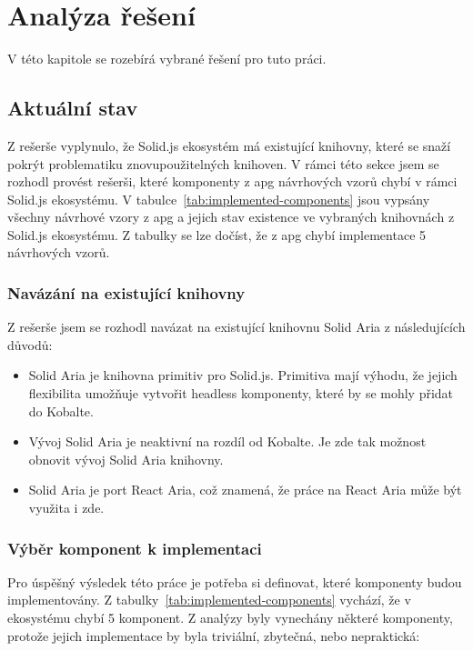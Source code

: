 \chapter{Analýza řešení}
\label{chap:analysis}

V této kapitole se rozebírá vybrané řešení pro tuto práci.

\section{Aktuální stav}

Z rešerše vyplynulo, že Solid.js ekosystém má existující knihovny, které se snaží pokrýt problematiku znovupoužitelných knihoven.
V rámci této sekce jsem se rozhodl provést rešerši, které komponenty z \gls{apg} návrhových vzorů chybí v rámci Solid.js ekosystému.
V tabulce~\ref{tab:implemented-components} jsou vypsány všechny návrhové vzory z \gls{apg} a jejich stav existence ve vybraných knihovnách z Solid.js ekosystému.
Z tabulky se lze dočíst, že z \gls{apg} chybí implementace 5 návrhových vzorů.

\subsection{Navázání na existující knihovny}

Z rešerše jsem se rozhodl navázat na existující knihovnu Solid Aria z následujících důvodů:

\begin{itemize}
      \item Solid Aria je knihovna primitiv pro Solid.js. Primitiva mají výhodu, že jejich flexibilita umožňuje vytvořit headless komponenty, které by se mohly přidat do Kobalte.
      \item Vývoj Solid Aria je neaktivní na rozdíl od Kobalte. Je zde tak možnost obnovit vývoj Solid Aria knihovny.
      \item Solid Aria je port React Aria, což znamená, že práce na React Aria může být využita i zde.
\end{itemize}

\subsection{Výběr komponent k implementaci}

Pro úspěšný výsledek této práce je potřeba si definovat, které komponenty budou implementovány.
Z tabulky~\ref{tab:implemented-components} vychází, že v ekosystému chybí 5 komponent.
Z analýzy byly vynechány některé komponenty, protože jejich implementace by byla triviální, zbytečná, nebo nepraktická:

